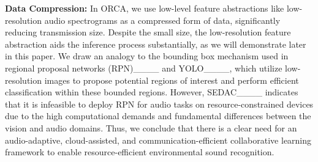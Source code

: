 \noindent
\textbf{Data Compression:}
 In ORCA, we use low-level feature abstractions like low-resolution audio spectrograms as a compressed form of data, significantly reducing transmission size. Despite the small size, the low-resolution feature abstraction aids the inference process substantially, as we will demonstrate later in this paper. We draw an analogy to the bounding box mechanism used in regional proposal networks (RPN)____ and YOLO____, which utilize low-resolution images to propose potential regions of interest and perform efficient classification within these bounded regions. However, SEDAC____ indicates that it is infeasible to deploy RPN for audio tasks on resource-constrained devices due to the high computational demands and fundamental differences between the vision and audio domains. Thus, we conclude that there is a clear need for an audio-adaptive, cloud-assisted, and communication-efficient collaborative learning framework to enable resource-efficient environmental sound recognition.


